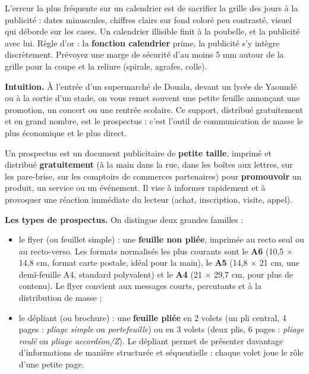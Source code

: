 \documentclass[11pt]{article}
\newcommand{\cle}[1]{{\popxbold\color{popdark}#1}}
\newcounter{popsec}
\newcounter{popsub}
\newcommand{\courssub}[1]{%
  \stepcounter{popsub}%
  \par\vspace{9pt}\noindent{\popxbold\fontsize{11.5}{13}\selectfont\color{popink}{\color{poporange}\thepopsec.\thepopsub}\hspace{6pt}#1}\par\nopagebreak\vspace{4pt}
}
\begin{document}
\begin{attention}
L'erreur la plus fréquente sur un calendrier est de sacrifier la grille des jours à la publicité : dates minuscules, chiffres clairs sur fond coloré peu contrasté, visuel qui déborde sur les cases. Un calendrier illisible finit à la poubelle, et la publicité avec lui. Règle d'or : la \textbf{fonction calendrier} prime, la publicité s'y intègre discrètement. Prévoyez une marge de sécurité d'au moins 5 mm autour de la grille pour la coupe et la reliure (spirale, agrafes, colle).
\end{attention}

\courssub{Le prospectus}

\textbf{Intuition.} À l'entrée d'un supermarché de Douala, devant un lycée de Yaoundé ou à la sortie d'un stade, on vous remet souvent une petite feuille annonçant une promotion, un concert ou une rentrée scolaire. Ce support, distribué gratuitement et en grand nombre, est le prospectus : c'est l'outil de communication de masse le plus économique et le plus direct.

\begin{definition}[Prospectus]
Un \cle{prospectus} est un document publicitaire de \textbf{petite taille}, imprimé et distribué \textbf{gratuitement} (à la main dans la rue, dans les boîtes aux lettres, sur les pare-brise, sur les comptoirs de commerces partenaires) pour \textbf{promouvoir} un produit, un service ou un événement. Il vise à informer rapidement et à provoquer une réaction immédiate du lecteur (achat, inscription, visite, appel).
\end{definition}

\textbf{Les types de prospectus.} On distingue deux grandes familles :

\begin{itemize}
\item le \cle{flyer} (ou feuillet simple) : une \textbf{feuille non pliée}, imprimée au recto seul ou au recto-verso. Les formats normalisés les plus courants sont le \textbf{A6} (10,5 $\times$ 14,8 cm, format carte postale, idéal pour la main), le \textbf{A5} (14,8 $\times$ 21 cm, une demi-feuille A4, standard polyvalent) et le \textbf{A4} (21 $\times$ 29,7 cm, pour plus de contenu). Le flyer convient aux messages courts, percutants et à la distribution de masse ;
\item le \cle{dépliant} (ou brochure) : une \textbf{feuille pliée} en 2 volets (un pli central, 4 pages : \emph{pliage simple} ou \emph{portefeuille}) ou en 3 volets (deux plis, 6 pages : \emph{pliage roulé} ou \emph{pliage accordéon/Z}). Le dépliant permet de présenter davantage d'informations de manière structurée et séquentielle : chaque volet joue le rôle d'une petite page.
\end{itemize}
\end{document}
